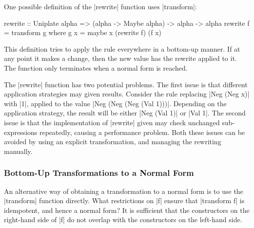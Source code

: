 One possible definition of the |rewrite| function uses |transform|:

\begin{code}
rewrite :: Uniplate alpha => (alpha -> Maybe alpha) -> alpha -> alpha
rewrite f = transform g
    where g x = maybe x (rewrite f) (f x)
\end{code}

This definition tries to apply the rule everywhere in a bottom-up manner. If at any point it makes a change, then the new value has the rewrite applied to it. The function only terminates when a normal form is reached.

The |rewrite| function has two potential problems. The first issue is that different application strategies may given results. Consider the rule replacing |Neg (Neg x)| with |1|, applied to the value |Neg (Neg (Neg (Val 1)))|. Depending on the application strategy, the result will be either |Neg (Val 1)| or |Val 1|. The second issue is that the implementation of |rewrite| given may check unchanged sub-expressions repeatedly, causing a performance problem. Both these issues can be avoided by using an explicit transformation, and managing the rewriting manually.

\subsubsection{Bottom-Up Transformations to a Normal Form}
\label{secU:rewrite_bottom}

An alternative way of obtaining a transformation to a normal form is to use the |transform| function directly. What restrictions on |f| ensure that |transform f| is idempotent, and hence a normal form? It is sufficient that the constructors on the right-hand side of |f| do not overlap with the constructors on the left-hand side.

